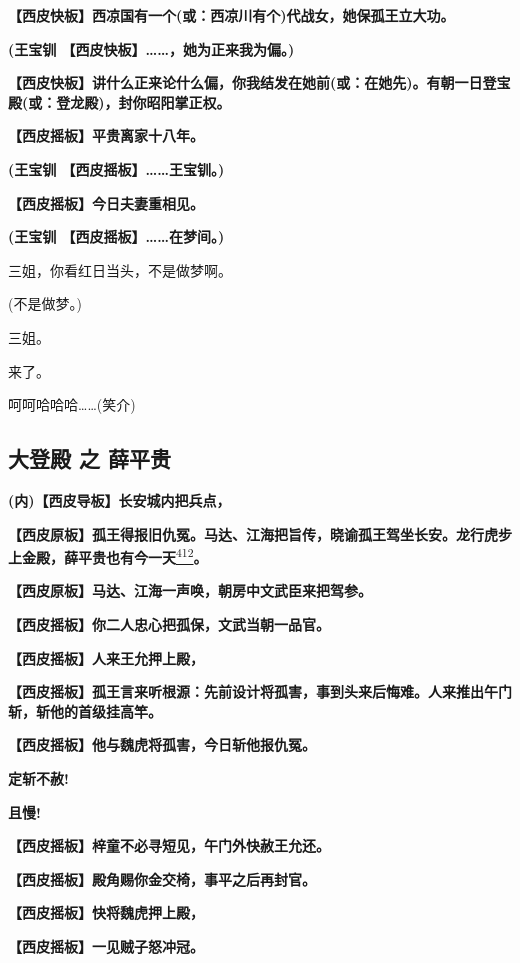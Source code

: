 \textbf{【西皮快板】西凉国有一个(或：西凉川有个)代战女，她保孤王立大功。}

\textbf{(王宝钏 【西皮快板】\ldots{}\ldots{}，她为正来我为偏。)}

\textbf{【西皮快板】讲什么正来论什么偏，你我结发在她前(或：在她先)。有朝一日登宝殿(或：登龙殿)，封你昭阳掌正权。}

\textbf{【西皮摇板】平贵离家十八年。}

\textbf{(王宝钏 【西皮摇板】\ldots{}\ldots{}王宝钏。)}

\textbf{【西皮摇板】今日夫妻重相见。}

\textbf{(王宝钏 【西皮摇板】\ldots{}\ldots{}在梦间。)}

三姐，你看红日当头，不是做梦啊。

(不是做梦。)

三姐。

来了。

呵呵哈哈哈\ldots{}\ldots{}(笑介)

\newpage
\hypertarget{ux5927ux767bux6bbf-ux4e4b-ux859bux5e73ux8d35}{%
\subsection{大登殿 之
薛平贵}\label{ux5927ux767bux6bbf-ux4e4b-ux859bux5e73ux8d35}}

\textbf{(内)【西皮导板】长安城内把兵点，}

\textbf{【西皮原板】孤王得报旧仇冤。马达、江海把旨传，晓谕孤王驾坐长安。龙行虎步上金殿，薛平贵也有今一天}\protect\hyperlink{fn412}{\textsuperscript{412}}\textbf{。}

\textbf{【西皮原板】马达、江海一声唤，朝房中文武臣来把驾参。}

\textbf{【西皮摇板】你二人忠心把孤保，文武当朝一品官。}

\textbf{【西皮摇板】人来王允押上殿，}

\textbf{【西皮摇板】孤王言来听根源：先前设计将孤害，事到头来后悔难。人来推出午门斩，斩他的首级挂高竿。}

\textbf{【西皮摇板】他与魏虎将孤害，今日斩他报仇冤。}

\textbf{定斩不赦!}

\textbf{且慢!}

\textbf{【西皮摇板】梓童不必寻短见，午门外快赦王允还。}

\textbf{【西皮摇板】殿角赐你金交椅，事平之后再封官。}

\textbf{【西皮摇板】快将魏虎押上殿，}

\textbf{【西皮摇板】一见贼子怒冲冠。}


